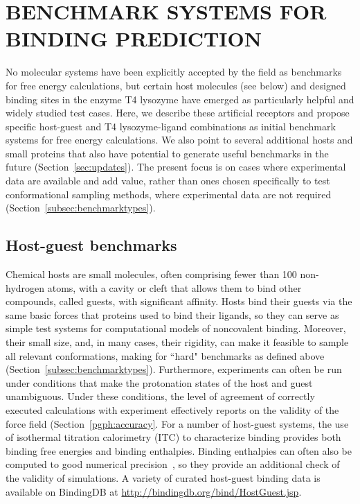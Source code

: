 \documentclass[aps,pre,twocolumn,nofootinbib,superscriptaddress,10pt, final,tightenlines]{revtex4-1}
\begin{document}
\section{BENCHMARK SYSTEMS FOR BINDING PREDICTION}
\label{benchmarks}
No molecular systems have been explicitly accepted by the field as benchmarks for free energy calculations, but certain host molecules (see below) and designed binding sites in the enzyme T4 lysozyme have emerged as particularly helpful and widely studied test cases. 
Here, we describe these artificial receptors and propose specific host-guest and T4 lysozyme-ligand combinations as initial benchmark systems for free energy calculations. 
We also point to several additional hosts and small proteins that also have potential to generate useful benchmarks in the future (Section~\ref{sec:updates}). 
The present focus is on cases where experimental data are available and add value, rather than ones chosen specifically to test conformational sampling methods, where experimental data are not required (Section~\ref{subsec:benchmarktypes}). 

\subsection{Host-guest benchmarks}
Chemical hosts are small molecules, often comprising fewer than 100 non-hydrogen atoms, with a cavity or cleft that allows them to bind other compounds, called guests, with significant affinity.  
Hosts bind their guests via the same basic forces that proteins used to bind their ligands, so they can serve as simple test systems for computational models of noncovalent binding. 
Moreover, their small size, and, in many cases, their rigidity, can make it feasible to sample all relevant conformations, making for ``hard" benchmarks as defined above (Section~\ref{subsec:benchmarktypes}).  
Furthermore, experiments can often be run under conditions that make the protonation states of the host and guest unambiguous. Under these conditions, the level of agreement of correctly executed calculations with experiment effectively reports on the validity of the force field (Section~\ref{pgph:accuracy}. 
For a number of host-guest systems, the use of isothermal titration calorimetry (ITC) to characterize binding provides both binding free energies and binding enthalpies. 
Binding enthalpies can often also be computed to good numerical precision~\cite{henriksen_computational_2015}, so they provide an additional check of the validity of simulations. A variety of curated host-guest binding data is available on BindingDB at \url{http://bindingdb.org/bind/HostGuest.jsp}.
\end{document}
